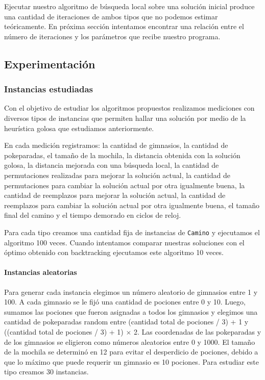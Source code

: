 Ejecutar nuestro algoritmo de b\'usqueda local sobre una soluci\'on inicial produce una cantidad de iteraciones de ambos tipos que no podemos estimar te\'oricamente. En pr\'oxima secci\'on intentamos encontrar una relaci\'on entre el n\'umero de iteraciones y los par\'ametros que recibe nuestro programa.

\subsection{Experimentación}


\subsubsection{Instancias estudiadas}
\label{sec:ej3_exp_instancias}

Con el objetivo de estudiar los algoritmos propuestos realizamos mediciones con diversos tipos de instancias que permiten hallar una soluci\'on por medio de la heur\'istica golosa que estudiamos anteriormente.

En cada medici\'on registramos: la cantidad de gimnasios, la cantidad de pokeparadas, el tamaño de la mochila, la distancia obtenida con la soluci\'on golosa, la distancia mejorada con una b\'usqueda local, la cantidad de permutaciones realizadas para mejorar la soluci\'on actual, la cantidad de permutaciones para cambiar la soluci\'on actual por otra igualmente buena, la cantidad de reemplazos para mejorar la soluci\'on actual, la cantidad de reemplazos para cambiar la soluci\'on actual por otra igualmente buena, el tamaño final del camino y el tiempo demorado en ciclos de reloj.

Para cada tipo creamos una cantidad fija de instancias de \texttt{Camino} y ejecutamos el algoritmo 100 veces. Cuando intentamos comparar nuestras soluciones con el \'optimo obtenido con backtracking ejecutamos este algoritmo 10 veces.

\paragraph{Instancias aleatorias}
Para generar cada instancia elegimos un n\'umero aleatorio de gimnasios entre 1 y 100. A cada gimnasio se le fij\'o una cantidad de pociones entre 0 y 10. Luego, sumamos las pociones que fueron asignadas a todos los gimnasios y elegimos una cantidad de pokeparadas random entre (cantidad total de pociones / 3) + 1 y ((cantidad total de pociones / 3) + 1) $\times$ 2. Las coordenadas de las pokeparadas y de los gimnasios se eligieron como n\'umeros aleatorios entre 0 y 1000. El tamaño de la mochila se determin\'o en 12 para evitar el desperdicio de pociones, debido a que lo m\'aximo que puede requerir un gimnasio es 10 pociones. Para estudiar este tipo creamos 30 instancias.

